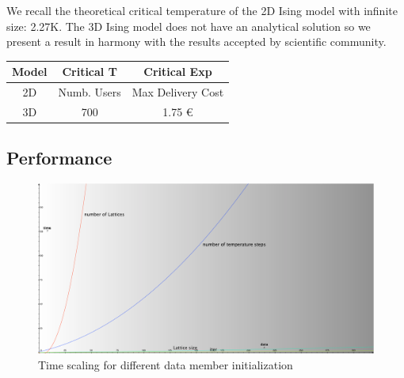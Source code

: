 \documentclass[11pt,a4paper]{article}
\begin{document}
We recall the theoretical critical temperature of the 2D Ising model with infinite size: 2.27K. The 3D Ising model does not have an analytical solution so we present a result in harmony with the results accepted by scientific community.
\begin{center}
  \begin{tabular}{c|c|c}
 	Model & Critical T & Critical Exp  \\
    \hline    
    \hline
    2D & Numb. Users & Max Delivery Cost \\
    \hline
    \hline
    3D & 700         & 1.75 \euro{}     \\
    \hline
  \end{tabular}
\end{center}


\newpage
\subsection*{Performance}
\begin{figure}[h!]
  \centering
   \includegraphics[width=\columnwidth]{img/Andamenti_performance.pdf} 
  \caption{Time scaling for different data member initialization}

\end{figure}
\end{document}

